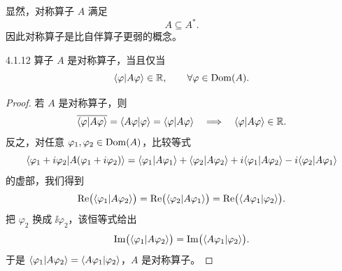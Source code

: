 显然，对称算子 $A$ 满足
\[
A\subseteq A^*.
\]
因此对称算子是比自伴算子更弱的概念。

\begin{proposition}{4.1.12}
  算子 $A$ 是对称算子，当且仅当
  \[
  \langle \varphi|A\varphi\rangle\in\mathbb{R},\qquad\forall\varphi\in\operatorname{Dom}(A).
  \]
\end{proposition}

\begin{proof}
  若 $A$ 是对称算子，则
  \[
  \overline{\langle \varphi|A\varphi\rangle}=\langle A\varphi|\varphi\rangle=\langle \varphi|A\varphi\rangle
  \quad\Longrightarrow\quad
  \langle \varphi|A\varphi\rangle\in\mathbb{R}.
  \]
  反之，对任意 $\varphi_1,\varphi_2\in\operatorname{Dom}(A)$，比较等式
  \[
  \langle \varphi_1+i\varphi_2|A(\varphi_1+i\varphi_2)\rangle
  =\langle \varphi_1|A\varphi_1\rangle+\langle \varphi_2|A\varphi_2\rangle
  +i\langle \varphi_1|A\varphi_2\rangle-i\langle \varphi_2|A\varphi_1\rangle
  \]
  的虚部，我们得到
  \[
  \operatorname{Re}\bigl(\langle \varphi_1|A\varphi_2\rangle\bigr)
  =\operatorname{Re}\bigl(\langle \varphi_2|A\varphi_1\rangle\bigr)
  =\operatorname{Re}\bigl(\langle A\varphi_1|\varphi_2\rangle\bigr).
  \]
  把 $\varphi_2$ 换成 $\ii\varphi_2$，该恒等式给出
  \[
  \operatorname{Im}\bigl(\langle \varphi_1|A\varphi_2\rangle\bigr)=\operatorname{Im}\bigl(\langle A\varphi_1|\varphi_2\rangle\bigr).
  \]
  于是 $\langle \varphi_1|A\varphi_2\rangle=\langle A\varphi_1|\varphi_2\rangle$，$A$ 是对称算子。
\end{proof}

